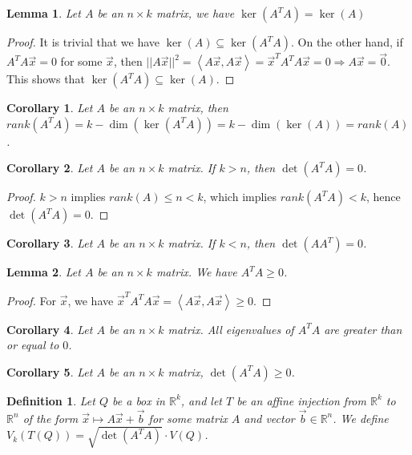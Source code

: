\documentclass[11pt,oneside]{book}
\theoremstyle{break}
\theoremstyle{break}
\newtheorem{lem}{Lemma}[thm]
\newtheorem{corL}{Corollary}[lem]
\newtheorem{defn}{Definition}[corL]
\newcommand{\R}{\mathbb{R}}
\begin{document}
\begin{lem}
Let $A$ be an $n \times k$ matrix, we have $\ker(A^TA) = \ker(A)$
\end{lem}
\begin{proof}
It is trivial that we have $\ker(A) \subseteq \ker(A^TA)$. On the other hand, if $A^TA\vec{x}=0$ for some $\vec{x}$, then $||A\vec{x}||^2=\left<A\vec{x}, A\vec{x}\right>= \vec{x}^TA^TA\vec{x} = 0 \Rightarrow A\vec{x} = \vec{0}$. This shows that $\ker(A^TA)\subseteq \ker(A)$.
\end{proof}

\begin{corL}
Let $A$ be an $n \times k$ matrix, then $rank(A^TA) = k-\dim(\ker(A^TA))=k-\dim(\ker(A)) = rank(A)$. 
\end{corL}

\begin{corL}
Let $A$ be an $n \times k$ matrix. If $k>n$, then $\det(A^TA) = 0$. 
\end{corL}
\begin{proof}
$k>n$ implies $rank(A) \leq n <k$, which implies $rank(A^TA)<k$, hence $\det(A^TA) = 0$.
\end{proof}

\begin{corL}
Let $A$ be an $n \times k$ matrix. If $k<n$, then $\det(AA^T) = 0$.
\end{corL}

\begin{lem}
Let $A$ be an $n \times k$ matrix. We have $A^TA\geq 0$.
\end{lem}
\begin{proof}
For $\vec{x}$, we have $\vec{x}^TA^TA\vec{x} = \left<A\vec{x},A\vec{x}\right>\geq 0$.
\end{proof}

\begin{corL}
Let $A$ be an $n \times k$ matrix. All eigenvalues of $A^TA$ are greater than or equal to $0$.
\end{corL}

\begin{corL}
Let $A$ be an $n \times k$ matrix, $\det(A^TA) \geq 0$. 
\end{corL}

\begin{defn}
Let $Q$ be a box in $\R^k$, and let $T$ be an affine injection from $\R^k$ to $\R^n$ of the form $\vec{x}\mapsto A\vec{x}+\vec{b}$ for some matrix $A$ and vector $\vec{b}\in \R^n$. We define $V_k(T(Q)) = \sqrt{\det(A^TA)}\cdot V(Q)$. 
\end{defn}
\end{document}
